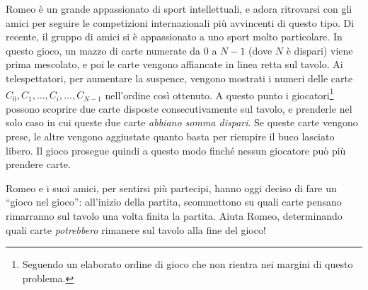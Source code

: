 \usepackage{xcolor}
\usepackage{afterpage}
\usepackage{pifont,mdframed}
\usepackage[bottom]{footmisc}
\usepackage[normalem]{ulem}


\renewcommand{\inputfile}{\texttt{input.txt}}
\renewcommand{\outputfile}{\texttt{output.txt}}

\newenvironment{warning}
  {\par\begin{mdframed}[linewidth=2pt,linecolor=gray]%
    \begin{list}{}{\leftmargin=1cm
                   \labelwidth=\leftmargin}\item[\Large\ding{43}]}
  {\end{list}\end{mdframed}\par}


{
\vspace{-1.75cm}\hfill{}
}
\vspace{.5cm}


Romeo \`e un grande appassionato di sport intellettuali, e adora ritrovarsi con gli amici per seguire le competizioni internazionali pi\`u avvincenti di questo tipo. Di recente, il gruppo di amici si \`e appassionato a uno sport molto particolare. In questo gioco, un mazzo di carte numerate da $0$ a $N-1$ (dove $N$ \`e dispari) viene prima mescolato, e poi le carte vengono affiancate in linea retta sul tavolo. Ai telespettatori, per aumentare la suspence, vengono mostrati i numeri delle carte $C_0, C_1, \ldots, C_i, \ldots, C_{N-1}$ nell'ordine cos\`i ottenuto. A questo punto i giocatori\footnote{Seguendo un elaborato ordine di gioco che non rientra nei margini di questo problema.} possono scoprire due carte disposte consecutivamente sul tavolo, e prenderle nel solo caso in cui queste due carte \emph{abbiano somma dispari}. Se queste carte vengono prese, le altre vengono aggiustate quanto basta per riempire il buco lasciato libero. Il gioco prosegue quindi a questo modo finch\'e nessun giocatore pu\`o pi\`u prendere carte.

Romeo e i suoi amici, per sentirsi pi\`u partecipi, hanno oggi deciso di fare un ``gioco nel gioco'': all'inizio della partita, scommettono su quali carte pensano rimarranno sul tavolo una volta finita la partita. Aiuta Romeo, determinando quali carte \emph{potrebbero} rimanere sul tavolo alla fine del gioco!

